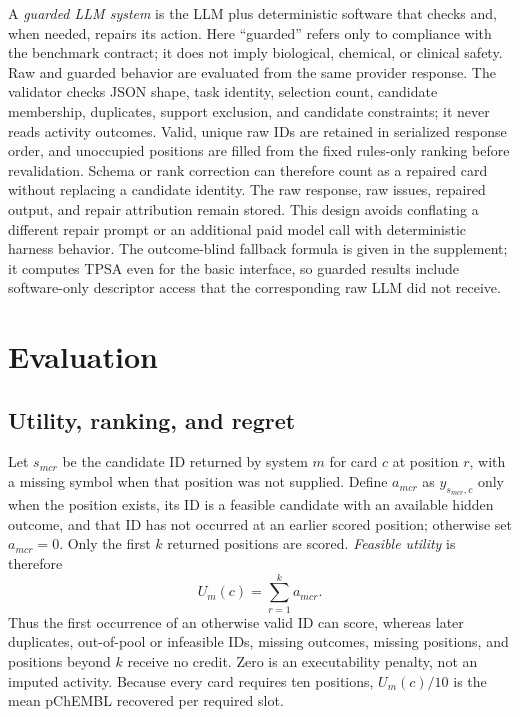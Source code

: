 \documentclass[10pt,a4paper]{article}
\begin{document}
A \emph{guarded LLM system} is the LLM plus deterministic software that checks
and, when needed, repairs its action. Here ``guarded'' refers only to compliance
with the benchmark contract; it does not imply biological, chemical, or
clinical safety. Raw and guarded behavior are evaluated from the same provider
response. The validator checks JSON shape, task identity, selection count,
candidate membership, duplicates, support exclusion, and candidate constraints;
it never reads activity outcomes. Valid, unique raw IDs are retained in
serialized response order, and unoccupied positions are filled from the fixed
rules-only ranking before revalidation. Schema or rank correction can therefore
count as a repaired card without replacing a candidate identity. The raw
response, raw issues, repaired output, and repair attribution remain stored.
This design avoids conflating a different repair prompt or an additional paid
model call with deterministic harness behavior. The outcome-blind fallback
formula is given in the supplement; it computes TPSA even for the basic
interface, so guarded results include software-only descriptor access that the
corresponding raw LLM did not receive.

\section{Evaluation}

\subsection{Utility, ranking, and regret}

Let $s_{mcr}$ be the candidate ID returned by system $m$ for card $c$ at
position $r$, with a missing symbol when that position was not supplied. Define
$a_{mcr}$ as $y_{s_{mcr},c}$ only when the position exists, its ID is a feasible
candidate with an available hidden outcome, and that ID has not occurred at an
earlier scored position; otherwise set $a_{mcr}=0$. Only the first $k$ returned
positions are scored. \emph{Feasible utility} is therefore
\begin{equation}
U_m(c)=\sum_{r=1}^{k}a_{mcr}.
\end{equation}
Thus the first occurrence of an otherwise valid ID can score, whereas later
duplicates, out-of-pool or infeasible IDs, missing outcomes, missing positions,
and positions beyond $k$ receive no credit. Zero is an executability penalty,
not an imputed activity. Because every card requires ten positions,
$U_m(c)/10$ is the mean pChEMBL recovered per required slot.
\end{document}
